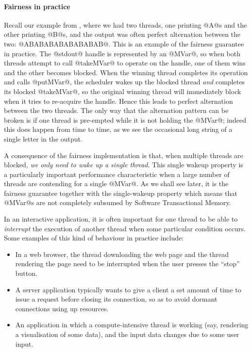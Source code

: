 \paragraph{Fairness in practice}  Recall our example from , where we had two threads,
one printing @A@s and the other printing @B@s, and the output was
often perfect alternation between the two: @ABABABABABABABAB@.  This
is an example of the fairness guarantee in practice.  The @stdout@
handle is represented by an @MVar@, so when both threads attempt to
call @takeMVar@ to operate on the handle, one of them wins and the
other becomes blocked.  When the winning thread completes its
operation and calls @putMVar@, the scheduler wakes up the blocked
thread \emph{and} completes its blocked @takeMVar@, so the original
winning thread will immediately block when it tries to re-acquire the
handle.  Hence this leads to perfect alternation between the two
threads.  The only way that the alternation pattern can be broken is if one
thread is pre-empted while it is not holding the @MVar@; indeed this
does happen from time to time, as we see the occasional long string of
a single letter in the output.


A consequence of the fairness implementation is that, when multiple
threads are blocked, \emph{we only need to wake up a single thread}.
This single wakeup property is a particularly important performance
characteristic when a large number of threads are contending for a
single @MVar@.  As we shall see later, it is the fairness guarantee
together with the single-wakeup property which means that @MVar@s are
not completely subsumed by Software Transactional Memory.


In an interactive application, it is often important for one thread to
be able to \emph{interrupt} the execution of another thread when some
particular condition occurs.  Some examples of this kind of behaviour
in practice include:

\begin{itemize}
\item In a web browser, the thread downloading the web page and the
  thread rendering the page need to be interrupted when the user
  presses the ``stop'' button.

\item A server application typically wants to give a client a set
  amount of time to issue a request before closing its connection, so
  as to avoid dormant connections using up resources.

\item An application in which a compute-intensive thread is working
  (say, rendering a visualisation of some data), and the input data
  changes due to some user input.
\end{itemize}

